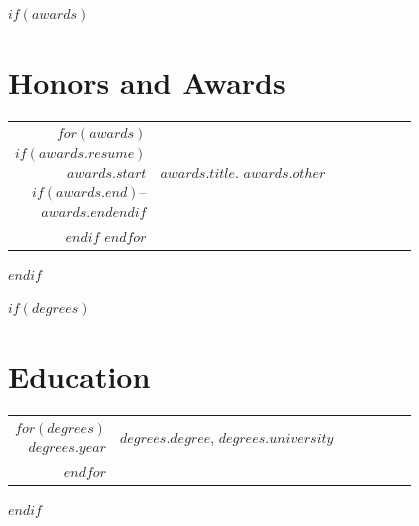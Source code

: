 \documentclass[10pt]{article}
\begin{document}
$if(awards)$
\section{Honors and Awards}
\begin{tabular}{rp{0.8\linewidth}}
$for(awards)$
$if(awards.resume)$
$awards.start$$if(awards.end)$--$awards.end$$endif$ & $awards.title$. $awards.other$\\
$endif$
$endfor$
\end{tabular}
$endif$

$if(degrees)$
\section{Education}
\begin{tabular}{rp{0.8\linewidth}}
$for(degrees)$
$degrees.year$ & \textbf{$degrees.degree$}, $degrees.university$\\
$endfor$
\end{tabular}
$endif$
\end{document}
